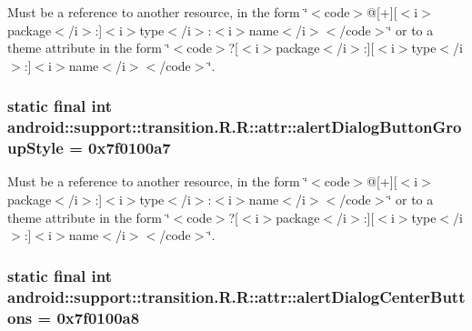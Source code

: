 Must be a reference to another resource, in the form \char`\"{}$<$code$>$@\mbox{[}+\mbox{]}\mbox{[}$<$i$>$package$<$/i$>$:\mbox{]}$<$i$>$type$<$/i$>$:$<$i$>$name$<$/i$>$$<$/code$>$\char`\"{} or to a theme attribute in the form \char`\"{}$<$code$>$?\mbox{[}$<$i$>$package$<$/i$>$:\mbox{]}\mbox{[}$<$i$>$type$<$/i$>$:\mbox{]}$<$i$>$name$<$/i$>$$<$/code$>$\char`\"{}. \hypertarget{classandroid_1_1support_1_1transition_1_1_r_1_1attr_76b50abdc3119b14a28e0041dc3dd775}{
\subsubsection[{alertDialogButtonGroupStyle}]{\setlength{\rightskip}{0pt plus 5cm}static final int android::support::transition.R.R::attr::alertDialogButtonGroupStyle = 0x7f0100a7}}
\label{classandroid_1_1support_1_1transition_1_1_r_1_1attr_76b50abdc3119b14a28e0041dc3dd775}


Must be a reference to another resource, in the form \char`\"{}$<$code$>$@\mbox{[}+\mbox{]}\mbox{[}$<$i$>$package$<$/i$>$:\mbox{]}$<$i$>$type$<$/i$>$:$<$i$>$name$<$/i$>$$<$/code$>$\char`\"{} or to a theme attribute in the form \char`\"{}$<$code$>$?\mbox{[}$<$i$>$package$<$/i$>$:\mbox{]}\mbox{[}$<$i$>$type$<$/i$>$:\mbox{]}$<$i$>$name$<$/i$>$$<$/code$>$\char`\"{}. \hypertarget{classandroid_1_1support_1_1transition_1_1_r_1_1attr_dfe6671468c472ac89b0330f73f823de}{
\subsubsection[{alertDialogCenterButtons}]{\setlength{\rightskip}{0pt plus 5cm}static final int android::support::transition.R.R::attr::alertDialogCenterButtons = 0x7f0100a8}}
\label{classandroid_1_1support_1_1transition_1_1_r_1_1attr_dfe6671468c472ac89b0330f73f823de}


